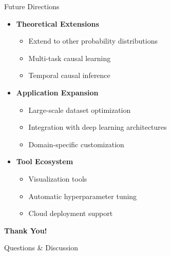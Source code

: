 \documentclass[aspectratio=169,10pt]{beamer}
\begin{document}
\begin{frame}{Future Directions}
\begin{itemize}
    \item \textbf{Theoretical Extensions}
    \begin{itemize}
        \item Extend to other probability distributions
        \item Multi-task causal learning
        \item Temporal causal inference
    \end{itemize}
    
    \item \textbf{Application Expansion}
    \begin{itemize}
        \item Large-scale dataset optimization
        \item Integration with deep learning architectures
        \item Domain-specific customization
    \end{itemize}
    
    \item \textbf{Tool Ecosystem}
    \begin{itemize}
        \item Visualization tools
        \item Automatic hyperparameter tuning
        \item Cloud deployment support
    \end{itemize}
\end{itemize}
\end{frame}







\begin{frame}
\begin{center}
{\Huge \textbf{Thank You!}}

\vspace{2em}

{\Large Questions \& Discussion}

\vspace{2em}

\end{center}
\end{frame}
\end{document}
